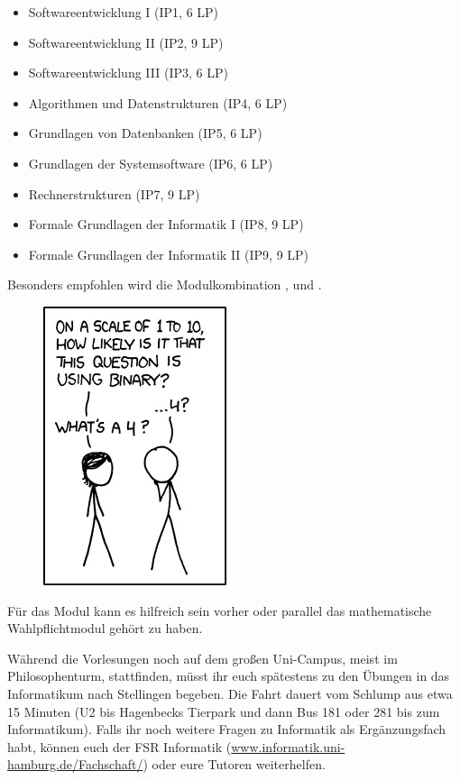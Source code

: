\begin{itemize}\itemsep 0pt
    \item Softwareentwicklung I (IP1, 6 LP)
    \item Softwareentwicklung II (IP2, 9 LP)
    \item Softwareentwicklung III (IP3, 6 LP)
    \item Algorithmen und Datenstrukturen (IP4, 6 LP)
    \item Grundlagen von Datenbanken (IP5, 6 LP)
    \item Grundlagen der Systemsoftware (IP6, 6 LP)
    \item Rechnerstrukturen (IP7, 9 LP)
    \item Formale Grundlagen der Informatik I (IP8, 9 LP)
    \item Formale Grundlagen der Informatik II (IP9, 9 LP)
\end{itemize}

Besonders empfohlen wird die Modulkombination ,
 und .
\begin{figure}
\includegraphics[scale=.8]{comics/953}
\end{figure}

Für das Modul  kann es hilfreich
sein vorher oder parallel das mathematische Wahlpflichtmodul  gehört zu haben.

Während die Vorlesungen noch auf dem großen Uni-Campus, meist im
Philosophenturm, stattfinden, müsst ihr euch spätestens zu den Übungen in das
Informatikum nach Stellingen begeben. Die Fahrt dauert vom Schlump aus etwa 15
Minuten (U2 bis Hagenbecks Tierpark und dann Bus 181 oder 281 bis zum
Informatikum). Falls ihr noch weitere Fragen zu Informatik als Ergänzungsfach
habt, können euch der FSR Informatik
(\url{www.informatik.uni-hamburg.de/Fachschaft/}) oder eure Tutoren
weiterhelfen.

